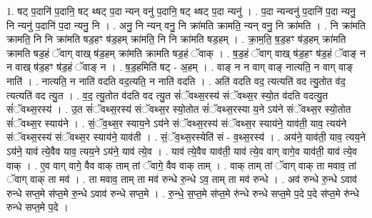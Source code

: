 \documentclass[17pt]{extarticle}
\begin{document}
1. षट् प॒दानि॑ प॒दानि॒ षट् थ्षट् प॒दा न्यन् वनु॑ प॒दानि॒ षट् थ्षट् प॒दा न्यनु॑ । . प॒दा न्यन्वनु॑ प॒दानि॑ प॒दा न्यनु॒ नि न्यनु॑ प॒दानि॑ प॒दा न्यनु॒ नि । . अनु॒ नि न्यन् वनु॒ नि क्रा॑मति क्रामति॒ न्यन् वनु॒ नि क्रा॑मति । . नि क्रा॑मति क्रामति॒ नि नि क्रा॑मति षड॒हꣳ ष॑ड॒हम् क्रा॑मति॒ नि नि क्रा॑मति षड॒हम् । . क्रा॒म॒ति॒ ष॒ड॒हꣳ ष॑ड॒हम् क्रा॑मति क्रामति षड॒हं ॅवाग् वाख् ष॑ड॒हम् क्रा॑मति क्रामति षड॒हं ॅवाक् । . ष॒ड॒हं ॅवाग् वाख् ष॑ड॒हꣳ ष॑ड॒हं ॅवाङ् न न वाख् ष॑ड॒हꣳ ष॑ड॒हं ॅवाङ् न । . ष॒ड॒हमिति॑ षट् - अ॒हम् । . वाङ् न न वाग् वाङ् नात्यति॒ न वाग् वाङ् नाति॑ । . नात्यति॒ न नाति॑ वदति वद॒त्यति॒ न नाति॑ वदति । . अति॑ वदति वद॒ त्यत्यति॑ वद त्यु॒तोत व॑द॒ त्यत्यति॑ वद त्यु॒त । . व॒द॒ त्यु॒तोत व॑दति वद त्यु॒त सं॑ॅवथ्स॒रस्य॑ संॅवथ्स॒र स्यो॒त व॑दति वदत्यु॒त सं॑ॅवथ्स॒रस्य॑ । . उ॒त सं॑ॅवथ्स॒रस्य॑ संॅवथ्स॒र स्यो॒तोत सं॑ॅवथ्स॒रस्या य॒ने ऽय॑ने संॅवथ्स॒र स्यो॒तोत सं॑ॅवथ्स॒र स्याय॑ने । . सं॒ॅव॒थ्स॒र स्याय॒ने ऽय॑ने संॅवथ्स॒रस्य॑ संॅवथ्स॒र स्याय॑ने॒ याव॑ती॒ याव॒ त्यय॑ने संॅवथ्स॒रस्य॑ संॅवथ्स॒र स्याय॑ने॒ याव॑ती । . सं॒ॅव॒थ्स॒रस्येति॑ सं - व॒थ्स॒रस्य॑ । . अय॑ने॒ याव॑ती॒ याव॒ त्यय॒ने ऽय॑ने॒ याव॑ त्ये॒वैव याव॒ त्यय॒ने ऽय॑ने॒ याव॑ त्ये॒व । . याव॑ त्ये॒वैव याव॑ती॒ याव॑ त्ये॒व वाग् वागे॒व याव॑ती॒ याव॑ त्ये॒व वाक् । . ए॒व वाग् वागे॒ वैव वाक् ताम् तां ॅवागे॒ वैव वाक् ताम् । . वाक् ताम् तां ॅवाग् वाक् ता मवाव॒ तां ॅवाग् वाक् ता मव॑ । . ता मवाव॒ ताम् ता मव॑ रुन्धे रु॒न्धे ऽव॒ ताम् ता मव॑ रुन्धे । . अव॑ रुन्धे रु॒न्धे ऽवाव॑ रुन्धे सप्त॒मे स॑प्त॒मे रु॒न्धे ऽवाव॑ रुन्धे सप्त॒मे । . रु॒न्धे॒ स॒प्त॒मे स॑प्त॒मे रु॑न्धे रुन्धे सप्त॒मे प॒दे प॒दे स॑प्त॒मे रु॑न्धे रुन्धे सप्त॒मे प॒दे । \newline
\end{document}
